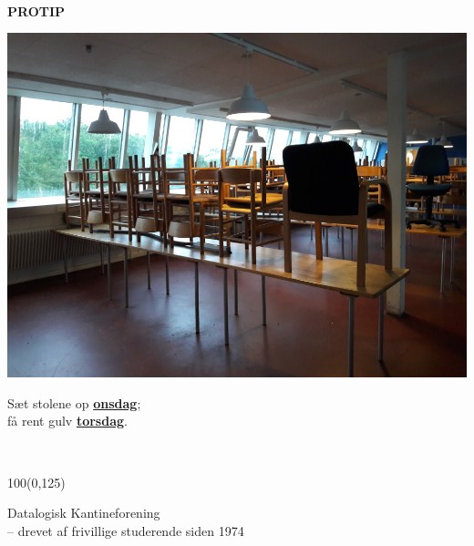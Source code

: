 \documentclass{article}
\begin{document}
~\vspace{1.3cm}

\Large

\begin{center}

\fontsize{20}{20}\selectfont

\textbf{PROTIP}

\vspace{0.5cm}

\includegraphics[scale=0.2]{billeder/stole-op.jpg}

\vspace{0.3cm}

\fontsize{15}{15}\selectfont

Sæt stolene op \textbf{\underline{onsdag}};\\ få rent gulv
\textbf{\underline{torsdag}}.

\end{center}


\normalsize

\vspace{\fill}

~

\begin{textblock}{100}(0,125)

\begin{flushright}
Datalogisk Kantineforening\\
-- drevet af frivillige studerende siden 1974
\end{flushright}

\end{textblock}
\end{document}
